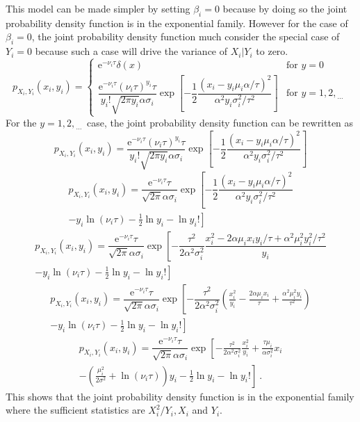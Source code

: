 \documentclass[12pt]{report}
\newcommand{\euler}{\mathrm{e}}
\newcommand{\dotdotdot}{_{\phantom{.}\cdots}}
\begin{document}
This model can be made simpler by setting $\beta_i=0$ because by doing so the joint probability density function is in the exponential family. However for the case of $\beta_i=0$, the joint probability density function much consider the special case of $Y_i=0$ because such a case will drive the variance of $X_i|Y_i$ to zero.
\begin{equation}
p_{X_i,Y_i}\left(x_i,y_i\right)=
\begin{cases}
\euler^{-\nu_i\tau}\delta(x) & \text{for }y=0
\\
\dfrac{\euler^{-\nu_i\tau}(\nu_i\tau)^{y_i}\tau}{y_i!\sqrt{2\pi y_i}\alpha\sigma_i}
\exp\left[-\dfrac{1}{2}\dfrac{\left(x_i-y_i\mu_i\alpha/\tau\right)^2}{\alpha^2y_i\sigma_i^2/\tau^2}\right] & \text{for }y=1,2,\dotdotdot
\end{cases}
\end{equation}
For the $y=1,2,\dotdotdot$ case, the joint probability density function can be rewritten as
\begin{equation}
p_{X_i,Y_i}\left(x_i,y_i\right)=\dfrac{\euler^{-\nu_i\tau}(\nu_i\tau)^{y_i}\tau}{y_i!\sqrt{2\pi y_i}\alpha\sigma_i}
\exp\left[-\dfrac{1}{2}\dfrac{\left(x_i-y_i\mu_i\alpha/\tau\right)^2}{\alpha^2y_i\sigma_i^2/\tau^2}\right]
\end{equation}
\begin{multline}
p_{X_i,Y_i}\left(x_i,y_i\right)=\dfrac{\euler^{-\nu_i\tau}\tau}{\sqrt{2\pi}\alpha\sigma_i}
\exp\left[-\dfrac{1}{2}\dfrac{\left(x_i-y_i\mu_i\alpha/\tau\right)^2}{\alpha^2y_i\sigma_i^2/\tau^2}
\right.
\\
\left.
-y_i\ln(\nu_i\tau) -\frac{1}{2}\ln{y_i} - \ln{y_i!}\right]
\end{multline}
\begin{multline}
p_{X_i,Y_i}\left(x_i,y_i\right)=\dfrac{\euler^{-\nu_i\tau}\tau}{\sqrt{2\pi}\alpha\sigma_i}
\exp\left[-\dfrac{\tau^2}{2\alpha^2\sigma_i^2}\dfrac{x_i^2-2\alpha\mu_ix_iy_i/\tau+\alpha^2\mu_i^2y_i^2/\tau^2}{y_i}
\right.
\\
\left.
-y_i\ln(\nu_i\tau) -\frac{1}{2}\ln{y_i} - \ln{y_i!}\right]
\end{multline}
\begin{multline}
p_{X_i,Y_i}\left(x_i,y_i\right)=\dfrac{\euler^{-\nu_i\tau}\tau}{\sqrt{2\pi}\alpha\sigma_i}
\exp\left[-\dfrac{\tau^2}{2\alpha^2\sigma_i^2}\left(\frac{x_i^2}{y_i}-\frac{2\alpha\mu_ix_i}{\tau}+\frac{\alpha^2\mu_i^2y_i}{\tau^2}\right)
\right.
\\
\left.
-y_i\ln(\nu_i\tau) -\frac{1}{2}\ln{y_i} - \ln{y_i!}\right]
\end{multline}
\begin{multline}
p_{X_i,Y_i}\left(x_i,y_i\right)=\dfrac{\euler^{-\nu_i\tau}\tau}{\sqrt{2\pi}\alpha\sigma_i}
\exp\left[
-\frac{\tau^2}{2\alpha^2\sigma_i^2}\frac{x_i^2}{y_i}
+\frac{\tau\mu_i}{\alpha\sigma_i^2}x_i
\right.
\\
\left.
-\left(\frac{\mu_i^2}{2\sigma^2}+\ln(\nu_i\tau)\right)y_i
-\frac{1}{2}\ln{y_i}
-\ln{y_i!}
\right] \ .
\end{multline}
This shows that the joint probability density function is in the exponential family where the sufficient statistics are $X_i^2/Y_i,X_i$ and $Y_i$.
\end{document}
